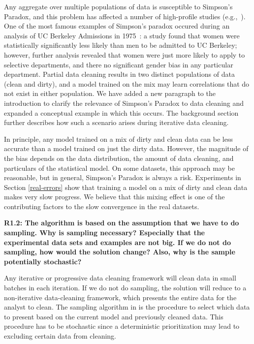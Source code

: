 \noindent Any aggregate over multiple populations of data is susceptible to Simpson's Paradox, and this problem has affected a number of high-profile studies (e.g.,~\cite{bickel1975sex, charig1986comparison}).
One of the most famous examples of Simpson's paradox occured during an analysis of UC Berkeley Admissions in 1975~\cite{bickel1975sex}: a study found that women were statistically significantly less likely than men to be admitted to UC Berkeley; however, further analysis revealed that women were just more likely to apply to selective departments, and there no significant gender bias in any particular department. 
Partial data cleaning results in two distinct populations of data (clean and dirty), and a model trained on the mix may learn correlations that do not exist in either population. 
We have added a new paragraph to the introduction to clarify the relevance of Simpson's Paradox to data cleaning and expanded a conceptual example in which this occurs.
The background section further describes how such a scenario arises during iterative data cleaning.

In principle, any model trained on a mix of dirty and clean data can be less accurate than a model trained on just the dirty data.
However, the magnitude of the bias depends on the data distribution, the amount of data cleaning, and particulars of the statistical model.
On some datasets, this approach may be reasonable, but in general, Simpson's Paradox is always a risk.
Experiments in Section \ref{real-errors} show that training a model on a mix of dirty and clean data makes very slow progress. 
We believe that this mixing effect is one of the contributing factors to the slow convergence in the real datasets.

\vspace{0.5em}

\noindent\textbf{R1.2: The algorithm is based on the assumption that we have to do sampling. Why is sampling necessary? Especially that the experimental data sets and examples are not big. If we do not do sampling, how would the solution change? Also, why is the sample potentially stochastic?}

\noindent Any iterative or progressive data cleaning framework will clean data in small batches in each iteration. 
If we do not do sampling, the solution will reduce to a non-iterative data-cleaning framework, which presents the entire data for the analyst to clean.
The sampling algorithm in \sys is the procedure to select which data to present based on the current model and previously cleaned data.
This procedure has to be stochastic since a deterministic prioritization may lead to excluding certain data from cleaning.

